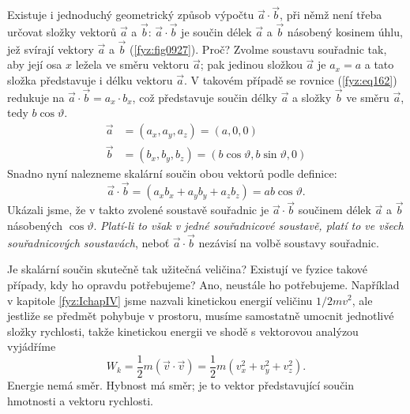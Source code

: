 
    Existuje i jednoduchý geometrický způsob výpočtu \(\vec{a}\cdot\vec{b}\), při němž není třeba
    určovat složky vektorů \(\vec{a}\) a \(\vec{b}\): \(\vec{a}\cdot\vec{b}\) je součin délek
    \(\vec{a}\) a \(\vec{b}\) násobený kosinem úhlu, jež svírají vektory \(\vec{a}\) a \(\vec{b}\)
    (\ref{fyz:fig0927}). Proč? Zvolme soustavu souřadnic tak, aby její osa \(x\) ležela ve směru
    vektoru \(\vec{a}\); pak jedinou složkou \(\vec{a}\) je \(a_x=a\) a tato složka představuje i
    délku vektoru \(\vec{a}\). V takovém případě se rovnice (\ref{fyz:eq162}) redukuje na
    \(\vec{a}\cdot\vec{b} = a_x\cdot b_x\), což představuje součin délky \(\vec{a}\) a složky
    \(\vec{b}\) ve směru \(\vec{a}\), tedy \(b\cos\vartheta\).
    \begin{equation}
      \begin{aligned}\label{fyz:eq753}
        \vec{a} &= (a_x, a_y, a_z) = (a, 0, 0)  \\
        \vec{b} &= (b_x, b_y, b_z) = (b\cos\vartheta, b\sin\vartheta, 0)
      \end{aligned}
    \end{equation}
    Snadno nyní nalezneme skalární součin obou vektorů podle definice: 
    \begin{equation*}
      \vec{a}\cdot\vec{b} = (a_xb_x + a_yb_y + a_zb_z) = ab\cos\vartheta.
    \end{equation*}
    Ukázali jsme, že v takto zvolené soustavě souřadnic je \(\vec{a}\cdot\vec{b}\) součinem délek 
    \(\vec{a}\) a \(\vec{b}\) násobených \(\cos\vartheta\). \emph{Platí-li to však v jedné 
    souřadnicové soustavě, platí to ve všech souřadnicových soustavách}, neboť 
    \(\vec{a}\cdot\vec{b}\) nezávisí na volbě soustavy souřadnic.
    
    

    Je skalární součin skutečně tak užitečná veličina? Existují ve fyzice takové případy, kdy ho 
    opravdu potřebujeme? Ano, neustále ho potřebujeme. Například v kapitole \ref{fyz:IchapIV} jsme 
    nazvali kinetickou energií veličinu \(1/2 mv^2\), ale jestliže se předmět pohybuje v prostoru, 
    musíme samostatně umocnit jednotlivé složky rychlosti, takže kinetickou energii ve shodě s 
    vektorovou analýzou vyjádříme
    \begin{equation}\label{fyz:eq165}
      W_k = \frac{1}{2}m(\vec{v}\cdot\vec{v}) = \frac{1}{2}m(v_x^2 + v_y^2 + v_z^2).
    \end{equation}
    Energie nemá směr. Hybnost má směr; je to vektor představující součin hmotnosti a vektoru
    rychlosti.
    
